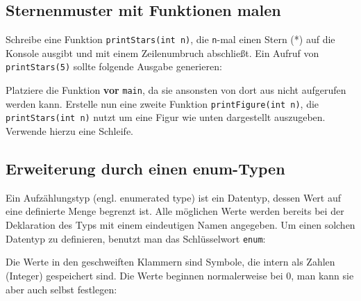\subsection{Sternenmuster mit Funktionen malen}

Schreibe eine Funktion \lstinline{printStars(int n)}, die \lstinline{n}-mal einen Stern (*) auf die Konsole ausgibt und mit einem Zeilenumbruch abschließt.
Ein Aufruf von \lstinline{printStars(5)} sollte folgende Ausgabe generieren:


Platziere die Funktion \textbf{vor} \lstinline{main}, da sie ansonsten von dort aus nicht aufgerufen werden kann.
Erstelle nun eine zweite Funktion \lstinline{printFigure(int n)}, die \lstinline{printStars(int n)} nutzt um eine Figur wie unten dargestellt auszugeben.
Verwende hierzu eine Schleife.



\subsection{Erweiterung durch einen enum-Typen}
\label{sec:basics_enumtype}
Ein Aufzählungstyp (engl. enumerated type) ist ein Datentyp, dessen Wert auf eine definierte Menge begrenzt ist. Alle möglichen Werte werden bereits bei der Deklaration des Typs mit einem eindeutigen Namen angegeben. Um einen solchen Datentyp zu definieren, benutzt man das Schlüsselwort \lstinline{enum}: 


Die Werte in den geschweiften Klammern sind Symbole, die intern als Zahlen (Integer) gespeichert sind. Die Werte beginnen normalerweise bei 0, man kann sie aber auch selbst festlegen:

